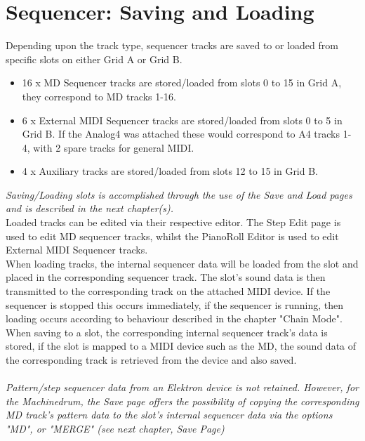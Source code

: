 \chapter{Sequencer: Saving and Loading}

Depending upon the track type, sequencer tracks are saved to or loaded from specific slots on either Grid A or Grid B. 

\begin{itemize}
    \item 16 x MD Sequencer tracks are stored/loaded from slots 0 to 15 in Grid A, they correspond to MD tracks 1-16.
    \item 6 x External MIDI Sequencer tracks are stored/loaded from slots 0 to 5 in Grid B. If the Analog4 was attached these would correspond to A4 tracks 1- 4, with 2 spare tracks for general MIDI.
    \item 4 x Auxiliary tracks are stored/loaded from slots 12 to 15 in Grid B. 
\end{itemize}

\textit{Saving/Loading slots is accomplished through the use of the Save and Load pages and is described in the next chapter(s).}\\

Loaded tracks can be edited via their respective editor. The Step Edit page is used to edit MD sequencer tracks, whilst the PianoRoll Editor is used to edit External MIDI Sequencer tracks.\\

When loading tracks, the internal sequencer data will be loaded from the slot and placed in the corresponding sequencer track. The slot's sound data is then transmitted to the corresponding track on the attached MIDI device. If the sequencer is stopped this occurs immediately, if the sequencer is running, then loading occurs according to behaviour described in the chapter "Chain Mode".\\

When saving to a slot, the corresponding internal sequencer track's data is stored, if the slot is mapped to a MIDI device such as the MD, the sound data of the corresponding track is retrieved from the device and also saved.\\
\\
\textit{Pattern/step sequencer data from an Elektron device is not retained. However, for the Machinedrum, the Save page offers the possibility of copying the corresponding MD track's pattern data to the slot's internal sequencer data via the options "MD", or "MERGE" (see next chapter, Save Page)}
\\\\


